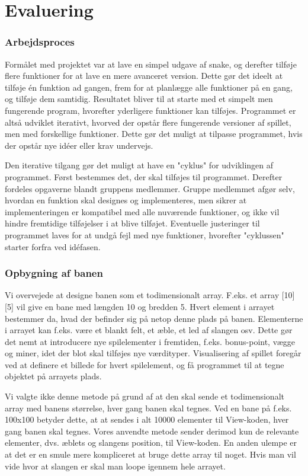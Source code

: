 \section{Evaluering}
 
\subsubsection{Arbejdsproces}
Formålet med projektet var at lave en simpel udgave af snake, og derefter tilføje flere funktioner for at lave en mere avanceret version. Dette gør det ideelt at tilføje én funktion ad gangen, frem for at planlægge alle funktioner på en gang, og tilføje dem samtidig. Resultatet bliver til at starte med et simpelt men fungerende program, hvorefter yderligere funktioner kan tilføjes. Programmet er altså udviklet iterativt, hvorved der opstår flere fungerende versioner af spillet, men med forskellige funktioner. Dette gør det muligt at tilpasse programmet, hvis der opstår nye idéer eller krav undervejs. 
 
Den iterative tilgang gør det muligt at have en "cyklus" for udviklingen af programmet. Først bestemmes det, der skal tilføjes til programmet. Derefter fordeles opgaverne blandt gruppens medlemmer. Gruppe medlemmet afgør selv, hvordan en funktion skal designes og implementeres, men sikrer at implementeringen er kompatibel med alle nuværende funktioner, og ikke vil hindre fremtidige tilføjelser i at blive tilføjet. Eventuelle justeringer til programmet laves for at undgå fejl med nye funktioner, hvorefter "cyklussen" starter forfra ved idéfasen.

\subsubsection{Opbygning af banen}
Vi overvejede at designe banen som et todimensionalt array. F.eks. et array [10][5] vil give en bane med længden 10 og bredden 5. Hvert element i arrayet bestemmer da, hvad der befinder sig på netop denne plads på banen. Elementerne i arrayet kan f.eks. være et blankt felt, et æble, et led af slangen osv. Dette gør det nemt at introducere nye spilelementer i fremtiden, f.eks. bonus-point, vægge og miner, idet der blot skal tilføjes nye værdityper. Visualisering af spillet foregår ved at definere et billede for hvert spilelement, og få programmet til at tegne objektet på arrayets plads.

Vi valgte ikke denne metode på grund af at den skal sende et todimensionalt array med banens størrelse, hver gang banen skal tegnes. Ved en bane på f.eks. 100x100 betyder dette, at at sendes i alt 10000 elementer til View-koden, hver gang banen skal tegnes. Vores anvendte metode sender derimod kun de relevante elementer, dvs. æblets og slangens position, til View-koden. En anden ulempe er at det er en smule mere kompliceret at bruge dette array til noget. Hvis man vil vide hvor at slangen er skal man loope igennem hele arrayet.

